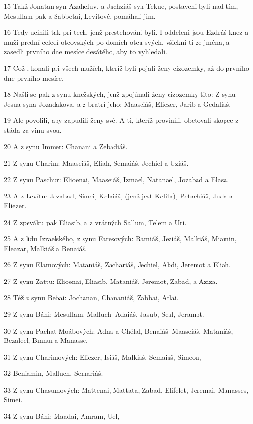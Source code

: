 \par 15 Takž Jonatan syn Azaheluv, a Jachziáš syn Tekue, postaveni byli nad tím, Mesullam pak a Sabbetai, Levítové, pomáhali jim.
\par 16 Tedy ucinili tak pri tech, jenž prestehováni byli. I oddeleni jsou Ezdráš knez a muži prední celedí otcovských po domích otcu svých, všickni ti ze jména, a zasedli prvního dne mesíce desátého, aby to vyhledali.
\par 17 Což i konali pri všech mužích, kteríž byli pojali ženy cizozemky, až do prvního dne prvního mesíce.
\par 18 Našli se pak z synu knežských, jenž zpojímali ženy cizozemky tito: Z synu Jesua syna Jozadakova, a z bratrí jeho: Maaseiáš, Eliezer, Jarib a Gedaliáš.
\par 19 Ale povolili, aby zapudili ženy své. A ti, kteríž provinili, obetovali skopce z stáda za vinu svou.
\par 20 A z synu Immer: Chanani a Zebadiáš.
\par 21 Z synu Charim: Maaseiáš, Eliah, Semaiáš, Jechiel a Uziáš.
\par 22 Z synu Paschur: Elioenai, Maaseiáš, Izmael, Natanael, Jozabad a Elasa.
\par 23 A z Levítu: Jozabad, Simei, Kelaiáš, (jenž jest Kelita), Petachiáš, Juda a Eliezer.
\par 24 Z zpeváku pak Eliasib, a z vrátných Sallum, Telem a Uri.
\par 25 A z lidu Izraelského, z synu Faresových: Ramiáš, Jeziáš, Malkiáš, Miamin, Eleazar, Malkiáš a Benaiáš.
\par 26 Z synu Elamových: Mataniáš, Zachariáš, Jechiel, Abdi, Jeremot a Eliah.
\par 27 Z synu Zattu: Elioenai, Eliasib, Mataniáš, Jeremot, Zabad, a Aziza.
\par 28 Též z synu Bebai: Jochanan, Chananiáš, Zabbai, Atlai.
\par 29 Z synu Báni: Mesullam, Malluch, Adaiáš, Jasub, Seal, Jeramot.
\par 30 Z synu Pachat Moábových: Adna a Chélal, Benaiáš, Maaseiáš, Mataniáš, Bezaleel, Binnui a Manasse.
\par 31 Z synu Charimových: Eliezer, Isiáš, Malkiáš, Semaiáš, Simeon,
\par 32 Beniamin, Malluch, Semariáš.
\par 33 Z synu Chasumových: Mattenai, Mattata, Zabad, Elifelet, Jeremai, Manasses, Simei.
\par 34 Z synu Báni: Maadai, Amram, Uel,
